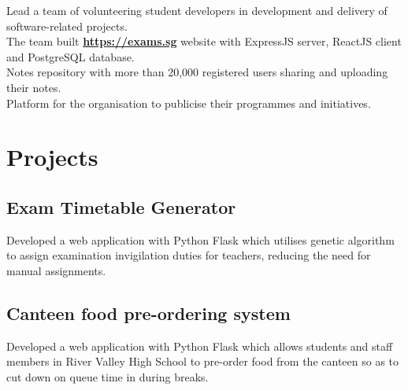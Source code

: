 \documentclass[a4paper,hidelinks]{resume} %
\begin{document}
\begin{minipage}[t]{0.50\textwidth}
    \textbullet{} Lead a team of volunteering student developers in development and delivery of software-related projects. \\
    \textbullet{} The team built \href{https://exams.sg}{\bf https://exams.sg} website with ExpressJS server, ReactJS client and PostgreSQL database. \\
    \textbullet{} Notes repository with more than 20,000 registered users sharing and uploading their notes. \\
    \textbullet{} Platform for the organisation to publicise their programmes and initiatives. \\
    
    
    \sectionspace %
    

    
    \section{Projects}
    
    \sectionspace %
    
    \subsection{Exam Timetable Generator}
    
    Developed a web application with Python Flask which utilises genetic algorithm to assign examination invigilation duties for teachers, reducing the need for manual assignments.
    
    \sectionspace %
    
    \subsection{Canteen food pre-ordering system}

    Developed a web application with Python Flask which allows students and staff members in River Valley High School to pre-order food from the canteen so as to cut down on queue time in during breaks.
    
    \sectionspace %
    

\end{minipage} %
\end{document}
